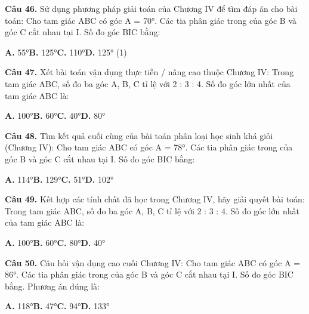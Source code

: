 \documentclass[11pt,a4paper]{article}
\begin{document}
\textbf{\color{primary} Câu 46.} Sử dụng phương pháp giải toán của Chương IV để tìm đáp án cho bài toán: Cho tam giác ABC có góc A = 70°. Các tia phân giác trong của góc B và góc C cắt nhau tại I. Số đo góc BIC bằng:\par
\hspace*{1.5em}\textbf{A.} 55°\quad\quad \textbf{B.} 125°\quad\quad \textbf{C.} 110°\quad\quad \textbf{D.} 125° (1)\par\vspace{2pt}
\textbf{\color{primary} Câu 47.} Xét bài toán vận dụng thực tiễn / nâng cao thuộc Chương IV: Trong tam giác ABC, số đo ba góc A, B, C tỉ lệ với 2 : 3 : 4. Số đo góc lớn nhất của tam giác ABC là:\par
\hspace*{1.5em}\textbf{A.} 100°\quad\quad \textbf{B.} 60°\quad\quad \textbf{C.} 40°\quad\quad \textbf{D.} 80°\par\vspace{2pt}
\textbf{\color{primary} Câu 48.} Tìm kết quả cuối cùng của bài toán phân loại học sinh khá giỏi (Chương IV): Cho tam giác ABC có góc A = 78°. Các tia phân giác trong của góc B và góc C cắt nhau tại I. Số đo góc BIC bằng:\par
\hspace*{1.5em}\textbf{A.} 114°\quad\quad \textbf{B.} 129°\quad\quad \textbf{C.} 51°\quad\quad \textbf{D.} 102°\par\vspace{2pt}
\textbf{\color{primary} Câu 49.} Kết hợp các tính chất đã học trong Chương IV, hãy giải quyết bài toán: Trong tam giác ABC, số đo ba góc A, B, C tỉ lệ với 2 : 3 : 4. Số đo góc lớn nhất của tam giác ABC là:\par
\hspace*{1.5em}\textbf{A.} 100°\quad\quad \textbf{B.} 60°\quad\quad \textbf{C.} 80°\quad\quad \textbf{D.} 40°\par\vspace{2pt}
\textbf{\color{primary} Câu 50.} Câu hỏi vận dụng cao cuối Chương IV: Cho tam giác ABC có góc A = 86°. Các tia phân giác trong của góc B và góc C cắt nhau tại I. Số đo góc BIC bằng. Phương án đúng là:\par
\hspace*{1.5em}\textbf{A.} 118°\quad\quad \textbf{B.} 47°\quad\quad \textbf{C.} 94°\quad\quad \textbf{D.} 133°\par\vspace{2pt}
\end{document}
